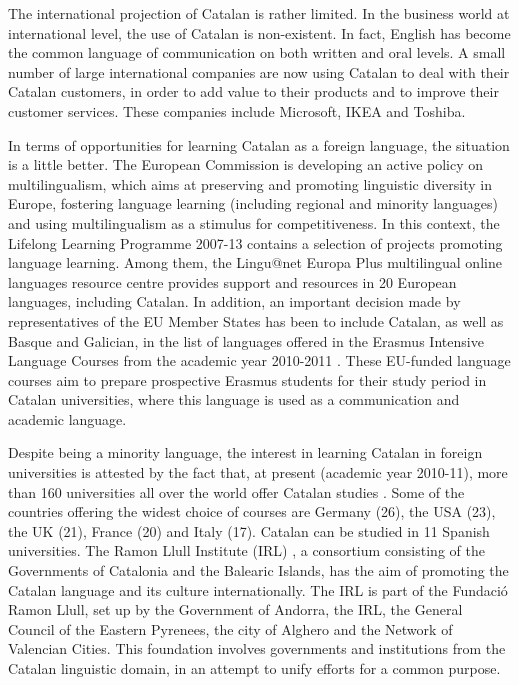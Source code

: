 \begin{multicols}{2}
The international projection of Catalan is rather limited. In the business world at international level, the use of Catalan is non-existent. In fact, English has become the common language of communication on both written and oral levels. A small number of large international companies are now using Catalan to deal with their Catalan customers, in order to add value to their products and to improve their customer services. These companies include Microsoft, IKEA and Toshiba.

In terms of opportunities for learning Catalan as a foreign language, the situation is a little better. The European Commission is developing an active policy on multilingualism, which aims at preserving and promoting linguistic diversity in Europe, fostering language learning (including regional and minority languages) and using multilingualism as a stimulus for competitiveness. In this context, the Lifelong Learning Programme 2007-13 contains a selection of projects promoting language learning. Among them, the Lingu@net Europa Plus multilingual online languages resource centre \cite{CAT-Nota9} provides support and resources in 20 European languages, including Catalan. In addition, an important decision made by representatives of the EU Member States has been to include Catalan, as well as Basque and Galician, in the list of languages offered in the Erasmus Intensive Language Courses from the academic year 2010-2011 \cite{CAT-Nota10}. These EU-funded language courses aim to prepare prospective Erasmus students for their study period in Catalan universities, where this language is used as a communication and academic language.

Despite being a minority language, the interest in learning Catalan in foreign universities is attested by the fact that, at present (academic year 2010-11), more than 160 universities all over the world offer Catalan studies \cite{CAT-Nota11}. Some of the countries offering the widest choice of courses are Germany (26), the USA (23), the UK (21), France (20) and Italy (17). Catalan can be studied in 11 Spanish universities. The Ramon Llull Institute (IRL) \cite{CAT-Nota12}, a consortium consisting of the Governments of Catalonia and the Balearic Islands, has the aim of promoting the Catalan language and its culture internationally. The IRL is part of the Fundació Ramon Llull, set up by the Government of Andorra, the IRL, the General Council of the Eastern Pyrenees, the city of Alghero and the Network of Valencian Cities. This foundation involves governments and institutions from the Catalan linguistic domain, in an attempt to unify efforts for a common purpose.


\end{multicols}
